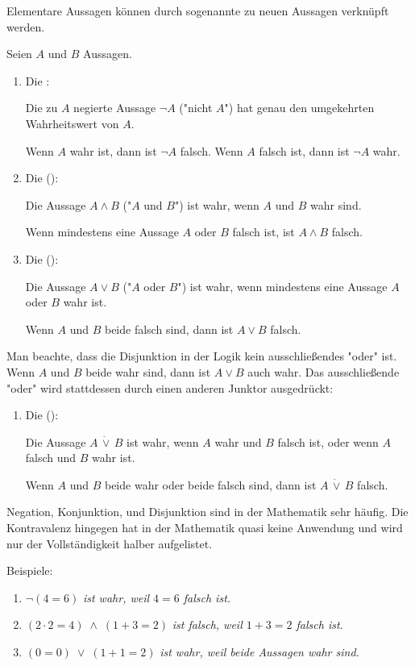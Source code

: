 Elementare Aussagen können durch sogenannte  zu neuen Aussagen verknüpft werden.

\begin{definition}[Junktoren]
    Seien $A$ und $B$ Aussagen.
    \begin{enumerate}
        \item Die :

        Die zu $A$ negierte Aussage $\neg A$ ("nicht $A$") hat genau den umgekehrten Wahrheitswert von $A$.

        Wenn $A$ wahr ist, dann ist $\neg A$ falsch. Wenn $A$ falsch ist, dann ist $\neg A$ wahr.
        \item Die  ():

        Die Aussage $A \land B$ ("$A$ und $B$") ist wahr, wenn $A$ und $B$ wahr sind.

        Wenn mindestens eine Aussage $A$ oder $B$ falsch ist, ist $A \land B$ falsch.
        \item Die  ():

        Die Aussage $A \lor B$ ("$A$ oder $B$") ist wahr, wenn mindestens eine Aussage $A$ oder $B$ wahr ist.
        
        Wenn $A$ und $B$ beide falsch sind, dann ist $A \lor B$ falsch.
    \end{enumerate}
    Man beachte, dass die Disjunktion in der Logik kein ausschließendes "oder" ist. Wenn $A$ und $B$ beide wahr sind, dann ist $A \lor B$ auch wahr. Das ausschließende "oder" wird stattdessen durch einen anderen Junktor ausgedrückt:
    \begin{enumerate}[resume]
        \item Die  ():

        Die Aussage $A \, \dot{\lor} \, B$ ist wahr, wenn $A$ wahr und $B$ falsch ist, oder wenn $A$ falsch und $B$ wahr ist.

        Wenn $A$ und $B$ beide wahr oder beide falsch sind, dann ist $A \, \dot{\lor} \, B$ falsch.
    \end{enumerate}
\end{definition}

Negation, Konjunktion, und Disjunktion sind in der Mathematik sehr häufig. Die Kontravalenz hingegen hat in der Mathematik quasi keine Anwendung und wird nur der Vollständigkeit halber aufgelistet.

\begin{example}
    Beispiele:
    \begin{enumerate}
        \item $\neg (4 = 6)$ \hfill \emph{ist wahr, weil $4 = 6$ falsch ist.}
        \item $(2 \cdot 2 = 4) \; \land \; (1 + 3 = 2)$ \hfill \emph{ist falsch, weil $1 + 3 = 2$ falsch ist.}
        \item $(0 = 0) \; \lor \; (1 + 1 = 2)$ \hfill \emph{ist wahr, weil beide Aussagen wahr sind.}
    \end{enumerate}
\end{example}

